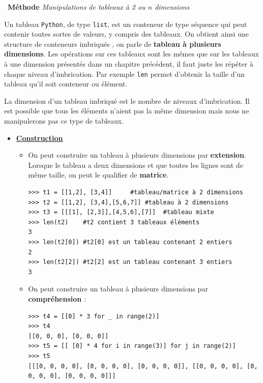 \documentclass[a4paper, french, 12pt]{article}
\newenvironment{methode}[1]
{\par \medskip    \noindent  
 \begin {bclogo}[arrondi =0.1,logo=\bcoutil, marge=4,noborder = true] {~\textbf{Méthode}   {\itshape #1} }  \par}
{
\end{bclogo}
 \par \bigskip }
\begin{document}
\begin{methode}{Manipulations de tableaux à 2 ou $n$ dimensions}

Un tableau \texttt{Python}, de type \texttt{list}, est un conteneur de type séquence qui peut contenir toutes sortes de valeurs, y compris des tableaux. On obtient ainsi une structure de conteneurs imbriqués , on parle de \textbf{tableau à plusieurs dimensions}. Les opérations sur ces tableaux sont les mêmes que sur les tableaux à une dimension présentés dans un chapitre précédent, il faut juste les répéter à chaque niveau d'imbrication. Par exemple \texttt{len} permet d'obtenir la taille d'un tableau qu'il soit conteneur ou élément.

La dimension d'un tableau imbriqué est le nombre de niveaux d'imbrication. Il est possible que tous les éléments n'aient pas la même dimension mais nous ne manipulerons pas ce type de tableaux. 


\begin{itemize}

\item \underline{\textbf{Construction}}

\begin{itemize}

 \item On peut construire un tableau à plusieurs dimensions par \textbf{extension}. Lorsque le tableau a deux dimensions et que toutes les lignes sont de même taille, on peut le qualifier de \textbf{matrice}. 
 
\begin{lstlisting}[style=compil]
>>> t1 = [[1,2], [3,4]]     #tableau/matrice à 2 dimensions
>>> t2 = [[1,2], [3,4],[5,6,7]] #tableau à 2 dimensions
>>> t3 = [[[1], [2,3]],[4,5,6],[7]]  #tableau mixte 
>>> len(t2)    #t2 contient 3 tableaux éléments
3
>>> len(t2[0]) #t2[0] est un tableau contenant 2 entiers
2
>>> len(t2[2]) #t2[2] est un tableau contenant 3 entiers
3

\end{lstlisting}

\item On peut construire un tableau à plusieurs dimensions par \textbf{compréhension} :

\begin{lstlisting}[style=compil]
>>> t4 = [[0] * 3 for _ in range(2)]
>>> t4
[[0, 0, 0], [0, 0, 0]]
>>> t5 = [[ [0] * 4 for i in range(3)] for j in range(2)]
>>> t5
[[[0, 0, 0, 0], [0, 0, 0, 0], [0, 0, 0, 0]], [[0, 0, 0, 0], [0, 0, 0, 0], [0, 0, 0, 0]]]
\end{lstlisting}



\end{itemize}
\end{itemize}
\end{methode}
\end{document}
